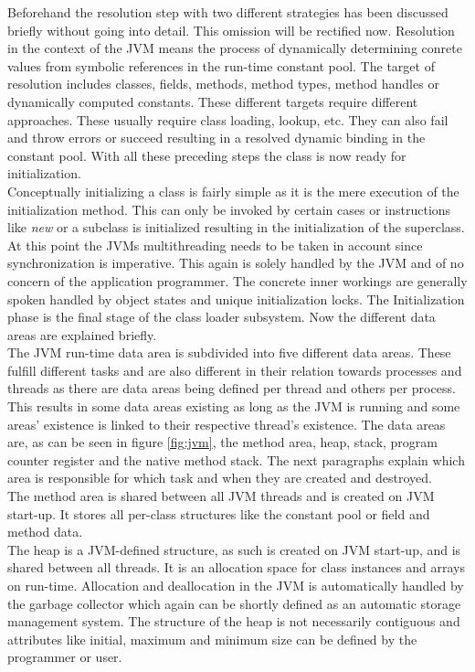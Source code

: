 Beforehand the resolution step with two different strategies has been discussed briefly without going into detail. This omission will be rectified now. Resolution in the context of the JVM means the process of dynamically determining conrete values from symbolic references in the run-time constant pool. The target of resolution includes classes, fields, methods, method types, method handles or dynamically computed constants. These different targets require different approaches. These usually require class loading, lookup, etc. They can also fail and throw errors or succeed resulting in a resolved dynamic binding in the constant pool. With all these preceding steps the class is now ready for initialization.\\
Conceptually initializing a class is fairly simple as it is the mere execution of the initialization method. This can only be invoked by certain cases or instructions like \emph{new} or a subclass is initialized resulting in the initialization of the superclass. At this point the JVMs multithreading needs to be taken in account since synchronization is imperative. This again is solely handled by the JVM and of no concern of the application programmer. The concrete inner workings are generally spoken handled by object states and unique initialization locks. The Initialization phase is the final stage of the class loader subsystem. Now the different data areas are explained briefly.\\
The JVM run-time data area is subdivided into five different data areas. These fulfill different tasks and are also different in their relation towards processes and threads as there are data areas being defined per thread and others per process. This results in some data areas existing as long as the JVM is running and some areas' existence is linked to their respective thread's existence. The data areas are, as can be seen in figure \ref{fig:jvm}, the method area, heap, stack, program counter register and the native method stack. The next paragraphs explain which area is responsible for which task and when they are created and destroyed.\\
The method area is shared between all JVM threads and is created on JVM start-up. It stores all per-class structures like the constant pool or field and method data.\\
The heap is a JVM-defined structure, as such is created on JVM start-up, and is shared between all threads. It is an allocation space for class instances and arrays on run-time. Allocation and deallocation in the JVM is automatically handled by the garbage collector which again can be shortly defined as an automatic storage management system. The structure of the heap is not necessarily contiguous and attributes like initial, maximum and minimum size can be defined by the programmer or user.\\
